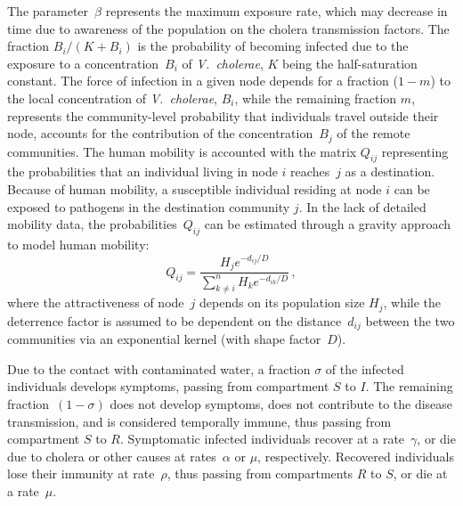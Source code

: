 The parameter~$\beta$ represents the maximum exposure rate, which may decrease in time due to awareness of the population on the cholera transmission factors\cite{Bertuzzo:ProbabilityExtinctionHaiti:2016}. The fraction $B_{i}/(K+B_{i})$ is the probability of becoming infected due to the exposure to a concentration~$B_i$ of \textit{V.~cholerae}, $K$ being the half-saturation constant\cite{Codeco:EndemicEpidemicDynamics:2001}. The force of infection in a given node depends for a fraction ($1-m$) to the local concentration of \textit{V.~cholerae}, $B_i$, while the remaining fraction $m$, represents the community-level probability that individuals travel outside their node, accounts for the contribution of the concentration~$B_j$ of the remote communities. 
The human mobility is accounted with the matrix $Q_{ij}$ representing the probabilities that an individual living in node $i$ reaches~$j$ as a destination. Because of human mobility, a susceptible individual residing at node $i$ can be exposed to pathogens in the destination community $j$. 
In the lack of detailed mobility data,  the probabilities~$Q_{ij}$ can be estimated through a gravity approach\cite{erlander_gravity_1990} to model human mobility:
%
\begin{equation}
Q_{ij} = \frac{H_j e^{-d_{ij}/D}}{\sum_{k \neq i}^n H_k e^{-d_{ik}/D}} \, ,
\label{eq:mob}
\end{equation}
%
where the attractiveness of node~$j$ depends on its population size $H_j$, while the deterrence factor is assumed to be dependent on the distance~$d_{ij}$ between the two communities via an exponential kernel (with shape factor~$D$).  

Due to the contact with contaminated water, a fraction $\sigma$ of the infected individuals develops symptoms, passing from compartment $S$ to $I$. The remaining fraction~$(1-\sigma)$ does not develop symptoms, does not contribute to the disease transmission, and is considered temporally immune, thus passing from compartment $S$ to $R$.  Symptomatic infected individuals recover at a rate~$\gamma$, or die due to cholera or other causes at rates~$\alpha$ or $\mu$, respectively.
Recovered individuals lose their immunity at rate~$\rho$, thus passing from compartments $R$ to $S$, or die at a rate~$\mu$.  %

